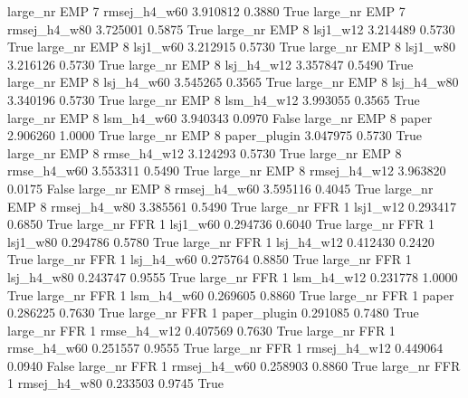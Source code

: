   large_nr      EMP                 7 rmsej_h4_w60    3.910812      0.3880    True
  large_nr      EMP                 7 rmsej_h4_w80    3.725001      0.5875    True
  large_nr      EMP                 8     lsj1_w12    3.214489      0.5730    True
  large_nr      EMP                 8     lsj1_w60    3.212915      0.5730    True
  large_nr      EMP                 8     lsj1_w80    3.216126      0.5730    True
  large_nr      EMP                 8   lsj_h4_w12    3.357847      0.5490    True
  large_nr      EMP                 8   lsj_h4_w60    3.545265      0.3565    True
  large_nr      EMP                 8   lsj_h4_w80    3.340196      0.5730    True
  large_nr      EMP                 8   lsm_h4_w12    3.993055      0.3565    True
  large_nr      EMP                 8   lsm_h4_w60    3.940343      0.0970   False
  large_nr      EMP                 8        paper    2.906260      1.0000    True
  large_nr      EMP                 8 paper_plugin    3.047975      0.5730    True
  large_nr      EMP                 8  rmse_h4_w12    3.124293      0.5730    True
  large_nr      EMP                 8  rmse_h4_w60    3.553311      0.5490    True
  large_nr      EMP                 8 rmsej_h4_w12    3.963820      0.0175   False
  large_nr      EMP                 8 rmsej_h4_w60    3.595116      0.4045    True
  large_nr      EMP                 8 rmsej_h4_w80    3.385561      0.5490    True
  large_nr      FFR                 1     lsj1_w12    0.293417      0.6850    True
  large_nr      FFR                 1     lsj1_w60    0.294736      0.6040    True
  large_nr      FFR                 1     lsj1_w80    0.294786      0.5780    True
  large_nr      FFR                 1   lsj_h4_w12    0.412430      0.2420    True
  large_nr      FFR                 1   lsj_h4_w60    0.275764      0.8850    True
  large_nr      FFR                 1   lsj_h4_w80    0.243747      0.9555    True
  large_nr      FFR                 1   lsm_h4_w12    0.231778      1.0000    True
  large_nr      FFR                 1   lsm_h4_w60    0.269605      0.8860    True
  large_nr      FFR                 1        paper    0.286225      0.7630    True
  large_nr      FFR                 1 paper_plugin    0.291085      0.7480    True
  large_nr      FFR                 1  rmse_h4_w12    0.407569      0.7630    True
  large_nr      FFR                 1  rmse_h4_w60    0.251557      0.9555    True
  large_nr      FFR                 1 rmsej_h4_w12    0.449064      0.0940   False
  large_nr      FFR                 1 rmsej_h4_w60    0.258903      0.8860    True
  large_nr      FFR                 1 rmsej_h4_w80    0.233503      0.9745    True
